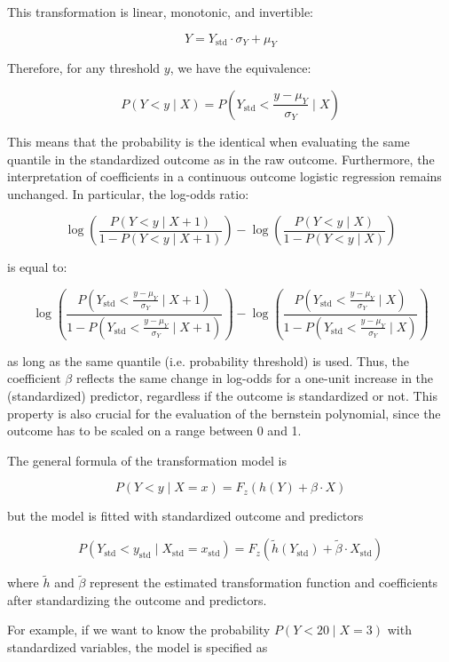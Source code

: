 This transformation is linear, monotonic, and invertible:

\[
Y = Y_{\text{std}} \cdot \sigma_Y + \mu_Y
\]

Therefore, for any threshold \( y \), we have the equivalence:

\[
P(Y < y \mid X) = P\left(Y_{\text{std}} < \frac{y - \mu_Y}{\sigma_Y} \mid X\right)
\]

This means that the probability is the identical when evaluating the same quantile in the standardized outcome as in the raw outcome. Furthermore, the interpretation of coefficients in a continuous outcome logistic regression remains unchanged. In particular, the log-odds ratio:

\[
\log \left( \frac{P(Y < y \mid X + 1)}{1 - P(Y < y \mid X + 1)} \right) -
\log \left( \frac{P(Y < y \mid X)}{1 - P(Y < y \mid X)} \right)
\]

is equal to:

\[
\log \left( \frac{P\left(Y_{\text{std}} < \frac{y - \mu_Y}{\sigma_Y} \mid X + 1\right)}{1 - P\left(Y_{\text{std}} < \frac{y - \mu_Y}{\sigma_Y} \mid X + 1\right)} \right) -
\log \left( \frac{P\left(Y_{\text{std}} < \frac{y - \mu_Y}{\sigma_Y} \mid X\right)}{1 - P\left(Y_{\text{std}} < \frac{y - \mu_Y}{\sigma_Y} \mid X\right)} \right)
\]

as long as the same quantile (i.e. probability threshold) is used. Thus, the coefficient \( \beta \) reflects the same change in log-odds for a one-unit increase in the (standardized) predictor, regardless if the outcome is standardized or not. This property is also crucial for the evaluation of the bernstein polynomial, since the outcome has to be scaled on a range between 0 and 1.


The general formula of the transformation model is

\[
P(Y < y \mid X = x) = F_z\left(h(Y) + \beta \cdot X\right)
\]

but the model is fitted with standardized outcome and predictors

\[
P(Y_{\text{std}} < y_{\text{std}} \mid X_{\text{std}} = x_{\text{std}}) = F_z\left(\tilde{h}(Y_{\text{std}}) + \tilde{\beta} \cdot X_{\text{std}}\right)
\]

where $\tilde{h}$ and $\tilde{\beta}$ represent the estimated transformation function and coefficients after standardizing the outcome and predictors.

For example, if we want to know the probability \( P(Y < 20 \mid X = 3) \) with standardized variables, the model is specified as

